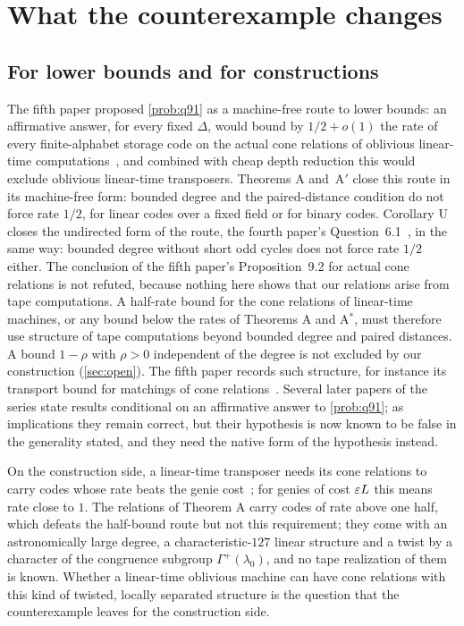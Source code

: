 \section{What the counterexample changes}\label{sec:limits}

\subsection{For lower bounds and for constructions}\label{sec:limits-machines}

The fifth paper proposed \cref{prob:q91} as a machine-free route to lower bounds: an affirmative answer, for every fixed
$\Delta$, would bound by $1/2+o(1)$ the rate of every finite-alphabet storage code on the actual cone relations of
oblivious linear-time computations~\cite[Proposition~9.2]{DirectedRecovery2026}, and combined with cheap depth reduction
this would exclude oblivious linear-time transposers. Theorems A and~A$'$ close this route in its machine-free form:
bounded degree and the paired-distance condition do not force rate $1/2$, for linear codes over a fixed field or for
binary codes. Corollary U closes the undirected form of the route, the fourth paper's
Question~6.1~\cite{CurvedMotion2026}, in the same way: bounded degree without short odd cycles does not force rate $1/2$
either. The conclusion of the fifth paper's Proposition~9.2 for actual cone relations is not refuted, because nothing here shows that
our relations arise from tape computations. A half-rate bound for the cone relations of linear-time machines, or any bound
below the rates of Theorems A and A$^*$, must therefore use structure of tape computations beyond bounded degree and
paired distances. A bound $1-\rho$ with $\rho>0$ independent of the degree is not excluded by our construction (\cref{sec:open}). The fifth paper
records such structure, for instance its transport bound for matchings of cone
relations~\cite[Lemmas~3.4 and~3.5]{DirectedRecovery2026}. Several later papers of the series state results conditional on an
affirmative answer to \cref{prob:q91}; as implications they remain correct, but their hypothesis is now known to be false in the
generality stated, and they need the native form of the hypothesis instead.

On the construction side, a linear-time transposer needs its cone relations to carry codes whose rate beats the genie
cost~\cite[Section~2]{DirectedRecovery2026}; for genies of cost $\varepsilon L$ this means rate close to $1$. The relations of
Theorem A carry codes of rate above one half, which defeats the half-bound route but not this requirement; they come with
an astronomically large degree, a characteristic-$127$ linear structure and a twist by a character of the congruence
subgroup $\Gamma^+(\lambda_0)$, and no tape realization of them is known. Whether a linear-time oblivious machine can have
cone relations with this kind of twisted, locally separated structure is the question that the counterexample leaves for
the construction side.

